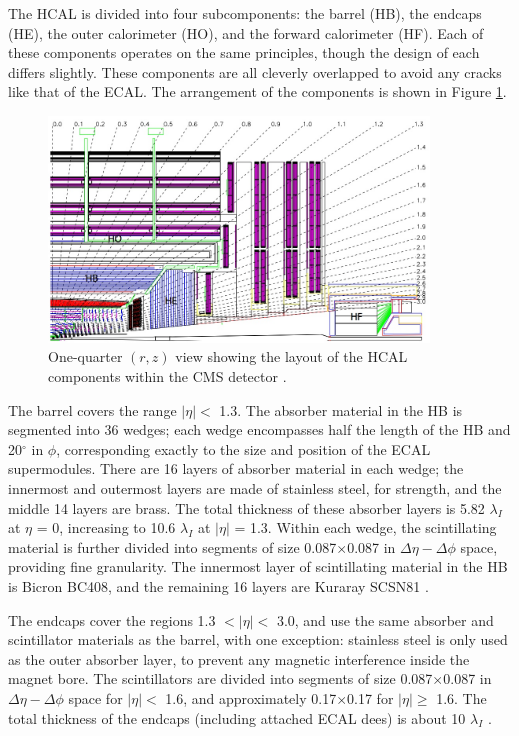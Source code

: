 The HCAL is divided into four subcomponents: the barrel (HB), the
endcaps (HE), the outer calorimeter (HO), and the forward calorimeter
(HF). Each of these components operates on the same principles, though
the design of each differs slightly. These components are all cleverly
overlapped to avoid any cracks like that of the ECAL. The arrangement
of the components is shown in Figure \ref{fig:cms:hcal}.

\begin{figure}[htb]
\centering
\includegraphics[width=0.9\textwidth]{figures/hcal-layout.jpg}
\caption[One-quarter $(r,z)$ view showing the layout of the HCAL components within the
CMS detector.]{One-quarter $(r,z)$ view showing the layout of the HCAL components within the
  CMS detector \cite{cms}.}
\label{fig:cms:hcal}
\end{figure}

The barrel covers the range $|\eta| <$ 1.3. The absorber material in
the HB is segmented into 36 wedges; each wedge encompasses half the
length of the HB and 20$^\circ$ in $\phi$, corresponding exactly to
the size and position of the ECAL supermodules. There are 16 layers of
absorber material in each wedge; the innermost and outermost layers are
made of stainless steel, for strength, and the middle 14 layers are
brass. The total thickness of these absorber layers is 5.82
$\lambda_I$ at $\eta$ = 0, increasing to 10.6 $\lambda_I$ at $|\eta|$
= 1.3. Within each wedge, the scintillating material is further
divided into segments of size 0.087$\times$0.087 in $\Delta\eta-\Delta\phi$
space, providing fine granularity. The innermost layer of
scintillating material in the HB is Bicron BC408, and the remaining 16
layers are Kuraray SCSN81 \cite{accelexper}.

The endcaps cover the regions 1.3 $< |\eta| <$ 3.0, and use the same
absorber and scintillator materials as the barrel, with one exception:
stainless steel is only used as the outer absorber layer, to
prevent any magnetic interference inside the magnet bore. The
scintillators are divided into segments of size 0.087$\times$0.087 in
$\Delta\eta-\Delta\phi$ space for $|\eta| <$ 1.6, and approximately
0.17$\times$0.17 for $|\eta| \geq$ 1.6. The total thickness of the
endcaps (including attached ECAL dees) is about 10 $\lambda_I$
\cite{accelexper}.

